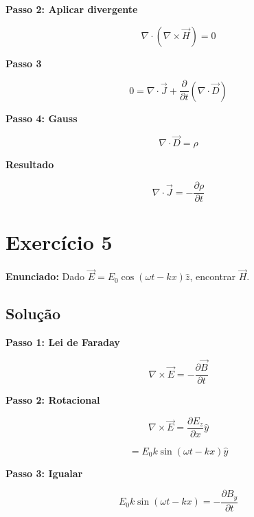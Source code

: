 \documentclass[12pt,a4paper]{article}
\begin{document}
\textbf{Passo 2: Aplicar divergente}

\begin{equation}
\nabla \cdot (\nabla \times \vec{H}) = 0
\end{equation}

\textbf{Passo 3}

\begin{equation}
0 = \nabla \cdot \vec{J} + \frac{\partial}{\partial t}(\nabla \cdot \vec{D})
\end{equation}

\textbf{Passo 4: Gauss}

\begin{equation}
\nabla \cdot \vec{D} = \rho
\end{equation}

\textbf{Resultado}

\begin{equation}
\boxed{\nabla \cdot \vec{J} = -\frac{\partial \rho}{\partial t}}
\end{equation}

\newpage

\section*{Exercício 5}

\textbf{Enunciado:} Dado $\vec{E} = E_0 \cos(\omega t - kx)\hat{z}$, encontrar $\vec{H}$.

\subsection*{Solução}

\textbf{Passo 1: Lei de Faraday}

\begin{equation}
\nabla \times \vec{E} = -\frac{\partial \vec{B}}{\partial t}
\end{equation}

\textbf{Passo 2: Rotacional}

\begin{equation}
\nabla \times \vec{E} = \frac{\partial E_z}{\partial x}\hat{y}
\end{equation}

\begin{equation}
= E_0 k \sin(\omega t - kx)\hat{y}
\end{equation}

\textbf{Passo 3: Igualar}

\begin{equation}
E_0 k \sin(\omega t - kx) = -\frac{\partial B_y}{\partial t}
\end{equation}
\end{document}
